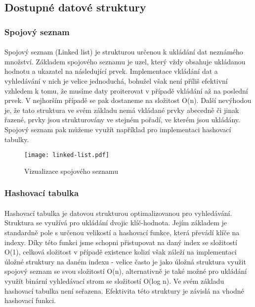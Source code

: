 ﻿\documentclass[12pt, a4paper]{article}
\begin{document}
 
\subsection{Dostupné datové struktury}
\subsubsection{Spojový seznam}
\paragraph{}
Spojový seznam (Linked list) je strukturou určenou k ukládání dat neznámého množství. Základem spojového seznamu je uzel, který vždy obsahuje ukládanou hodnotu a ukazatel na následující prvek. Implementace vkládání dat a vyhledávání v nich je velice jednoduchá, bohužel však není příliš efektivní vzhledem k tomu, že musíme daty proiterovat v případě vkládání až na poslední prvek. V nejhorším případě se pak dostaneme na složitost O(n). Další nevýhodou je, že tato struktura ve svém základu nemá vkládané prvky abecedně či jinak řazené, prvky jsou strukturovány ve stejném pořadí, ve kterém jsou ukládány. Spojový seznam pak můžeme využít například pro implementaci hashovací tabulky. 

\begin{figure}[!ht]
	\centering
	\texttt{[image: linked-list.pdf]}
	\caption{Vizualizace spojového seznamu}
\end{figure}

\subsubsection{Hashovací tabulka}
\paragraph{}
Hashovací tabulka je datovou strukturou optimalizovanou pro vyhledávání. Struktura se využívá pro ukládání dvojic klíč-hodnota. Jejím základem je standardně pole s určenou velikostí a hashovací funkce, která převádí klíče na indexy. Díky této funkci jsme schopni přistupovat na daný index se složitostí O(1), celková složitost v případě existence kolizí však záleží na implementaci úložné struktury na daném indexu - velice často je jako úložná struktura využit spojový seznam se svou složitostí O(n), alternativně je také možné pro ukládání využít binární vyhledávací strom se složitostí O(log n). Ve svém základu hashovací tabulka není seřazena. Efektivita této struktury je závislá na vhodné hashovací funkci.
\end{document}
